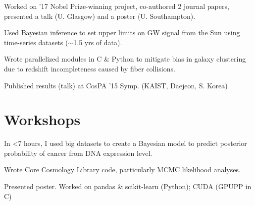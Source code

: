 \documentclass[]{deedy-resume-openfont}
\begin{document}
\begin{minipage}[t]{0.66\textwidth}
 \hfill {}
\begin{tightemize}
\item Worked on '17 Nobel Prize-winning project, co-authored 2 journal papers, presented a talk (U. Glasgow) and a poster (U. Southampton).\item Used Bayesian inference to set upper limits on GW signal from the Sun using time-series datasets ($\sim$1.5 yrs of data). \end{tightemize}
\sectionsep

 \hfill  {}

\begin{tightemize}
\item Wrote parallelized modules in C \& Python to mitigate bias in galaxy clustering due to redshift incompleteness caused by fiber collisions. \item Published results (talk) at CosPA '15 Symp. (KAIST, Daejeon, S. Korea) \end{tightemize}
\sectionsep


\section{\color{Blue} Workshops}
In <7 hours, I used big datasets to create a Bayesian model to predict posterior probability of cancer from DNA expression level.
\sectionsep

Wrote Core Cosmology Library code, particularly MCMC likelihood analyses.
\sectionsep


Presented poster. Worked on pandas \& scikit-learn (Python); CUDA (GPUPP in C)
\sectionsep




\end{minipage} 
\end{document}
